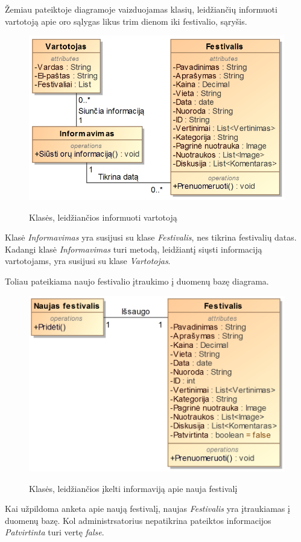 ﻿\documentclass{VUMIFPSkursinis}
\begin{document}
Žemiau pateiktoje diagramoje vaizduojamas klasių, leidžiančių informuoti vartotoją apie oro sąlygas likus trim dienom iki festivalio, sąryšis.
\begin{figure}[H]
\centering
    \includegraphics[scale=0.45]{img/PSI3/orai.PNG}
	\label{uml:19}
	\caption{Klasės, leidžiančios informuoti vartotoją}
\end{figure}
Klasė \textit{Informavimas} yra susijusi su klase \textit{Festivalis}, nes tikrina festivalių datas. Kadangi klasė \textit{Informavimas} turi metodą, leidžiantį siųsti informaciją vartotojams, yra susijusi su klase \textit{Vartotojas}.

Toliau pateikiama naujo festivalio įtraukimo į duomenų bazę diagrama.
\begin{figure}[H]
\centering
    \includegraphics[scale=0.45]{img/PSI3/naujas.PNG}
	\label{uml:20}
	\caption{Klasės, leidžiančios įkelti informaviją apie nauja festivalį}
\end{figure}
Kai užpildoma anketa apie naują festivalį, naujas \textit{Festivalis} yra įtraukiamas į duomenų bazę. Kol administrsatorius nepatikrina pateiktos informacijos \textit{Patvirtinta} turi vertę \textit{false}.
\end{document}
